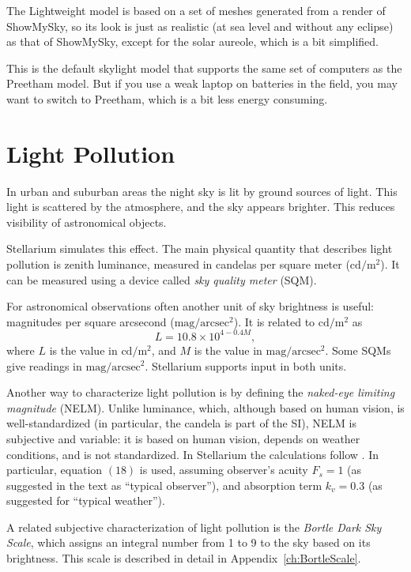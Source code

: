 The Lightweight model is based on a set of meshes generated from a render of ShowMySky, so its look is just as realistic (at sea level and without any eclipse) as that of ShowMySky, except for the solar aureole, which is a bit simplified.

This is the default  skylight model that supports the same set of computers as the Preetham model. But if you use a weak laptop on batteries in the field, you may want to switch to Preetham, which is a bit less energy consuming.

\section{Light Pollution}

In urban and suburban areas the night sky is lit by ground sources of light.
This light is scattered by the atmosphere, and the sky appears brighter. This
reduces visibility of astronomical objects.

Stellarium simulates this effect. The main physical quantity that describes light pollution is zenith luminance, measured in candelas per square meter ($\mathrm{cd/m^2}$). It can be measured using a device called \emph{sky quality meter} (SQM).

For astronomical observations often another unit of sky brightness is useful: magnitudes per square arcsecond ($\mathrm{mag/arcsec^2}$). It is related to $\mathrm{cd/m^2}$ as
\begin{equation}
L=10.8\times10^{4-0.4M},
\end{equation}
where $L$ is the value in $\mathrm{cd/m^2}$, and $M$ is the value in $\mathrm{mag/arcsec^2}$. Some SQMs give readings in $\mathrm{mag/arcsec^2}$. Stellarium supports input in both units.

Another way to characterize light pollution is by defining the \emph{naked-eye limiting magnitude} (NELM). Unlike luminance, which, although based on human vision, is well-standardized (in particular, the candela is part of the SI), NELM is subjective and variable: it is based on human vision, depends on weather conditions, and is not standardized. In Stellarium the calculations follow \citet{Schaefer:LimitingMagnitudes}. In particular, equation $(18)$ is used, assuming observer's acuity $F_s=1$ (as suggested in the text as ``typical observer''), and absorption term $k_v=0.3$ (as suggested for ``typical weather'').

A related subjective characterization of light pollution is the \emph{Bortle Dark Sky Scale}, which assigns an integral number from 1 to 9 to the sky based on its brightness. This scale is described in detail in Appendix~\ref{ch:BortleScale}.


